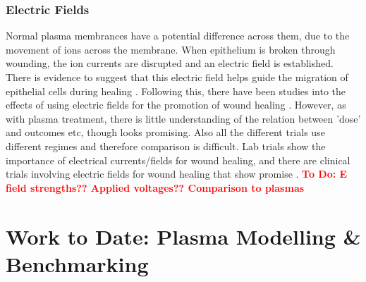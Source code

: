\documentclass[11pt, oneside]{article}   	%
\newcommand{\todo}[1]{ \textcolor{red}{\bf{To Do:} #1}}
\begin{document}
%
%


\subsubsection{Electric Fields}

Normal plasma membrances have a potential difference across them, due to the movement of ions across the membrane.
When epithelium is broken through wounding, the ion currents are disrupted and an electric field is established.
There is evidence to suggest that this electric field helps guide the migration of epithelial cells during healing \cite{Zhao2009electrical}.
Following this, there have been studies into the effects of using electric fields for the promotion of wound healing \cite{Thakral2013electrical, Messerli2011extracellular}.
However, as with plasma treatment, there is little understanding of the relation between 'dose' and outcomes etc, though looks promising.
Also all the different trials use different regimes and therefore comparison is difficult.
Lab trials show the importance of electrical currents/fields for wound healing, and there are clinical trials involving electric fields for wound healing that show promise \cite{Messerli2011extracellular}.
\todo{E field strengths?? Applied voltages?? Comparison to plasmas}

\section{Work to Date: Plasma Modelling \& Benchmarking}
\end{document}

